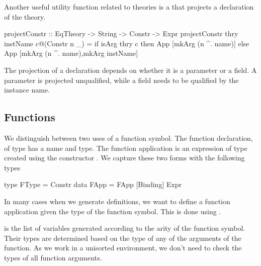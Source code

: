 Another useful utility function related to theories is a  that projects a declaration of the theory. 
\begin{hscode}
projectConstr :: EqTheory -> String -> Constr -> Expr 
projectConstr thry instName c@(Constr n _)  =
  if isArg thry c then App [mkArg (n ^. name)]
  else App [mkArg (n ^. name),mkArg instName]
\end{hscode}
The projection of a declaration depends on whether it is a parameter or a field. A parameter is projected unqualified, while a field needs to be qualified by the instance name. 

\subsection{Functions}
We distinguish between two uses of a function symbol. The function declaration, of type  has a name and type. The function application is an expression of type  created using the constructor . We capture these two forms with the following types 
\begin{hscode}
type FType = Constr
data FApp = FApp [Binding] Expr
\end{hscode}

In many cases when we generate definitions, we want to define a function application given the type of the function symbol. This is done using . 
 is the list of variables generated according to the arity of the function symbol. Their types are determined based on the type of any of the arguments of the function. As we work in a unisorted environment, we don't need to check the types of all function arguments. 

